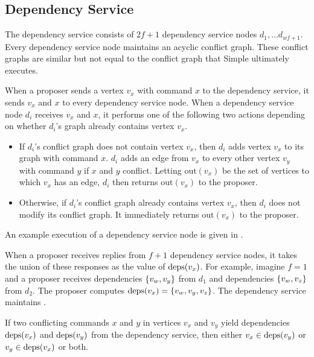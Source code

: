\subsection{Dependency Service}
The dependency service consists of $2f+1$ dependency service nodes $d_1, \ldots
d_{wf+1}$. Every dependency service node maintains an acyclic conflict graph.
These conflict graphs are similar but not equal to the conflict graph that
Simple \BPaxos{} ultimately executes.

\newcommand{\out}[1]{\text{out}(#1)}
When a proposer sends a vertex $v_x$ with command $x$ to the dependency
service, it sends $v_x$ and $x$ to every dependency service node. When a
dependency service node $d_i$ receives $v_x$ and $x$, it performs one of the
following two actions depending on whether $d_i$'s graph already contains
vertex $v_x$.
\begin{itemize}
  \item
    If $d_i$'s conflict graph does not contain vertex $v_x$, then $d_i$ adds
    vertex $v_x$ to its graph with command $x$. $d_i$ adds an edge from $v_x$
    to every other vertex $v_y$ with command $y$ if $x$ and $y$ conflict.
    Letting $\out{v_x}$ be the set of vertices to which $v_x$ has an edge,
    $d_i$ then returns $\out{v_x}$ to the proposer.

  \item
    Otherwise, if $d_i$'s conflict graph already contains vertex $v_x$, then
    $d_i$ does not modify its conflict graph. It immediately returns
    $\out{v_x}$ to the proposer.
\end{itemize}
An example execution of a dependency service node is given in
.

When a proposer receives replies from $f+1$ dependency service nodes, it
takes the union of these responses as the value of $\text{deps}(v_x)$. For example,
imagine $f= 1$ and a proposer receives dependencies $\{v_w, v_y\}$ from $d_1$
and dependencies $\{v_w, v_z\}$ from $d_2$. The proposer computes $\text{deps}(v_x)
= \{v_w, v_y, v_z\}$. The dependency service maintains
.

{}

\begin{invariant}
If two conflicting commands $x$ and $y$ in vertices $v_x$ and $v_y$ yield
dependencies $\text{deps}(v_x)$ and $\text{deps}(v_y)$ from the dependency service, then
either $v_x \in \text{deps}(v_y)$ or $v_y \in \text{deps}(v_x)$ or both.
\end{invariant}

